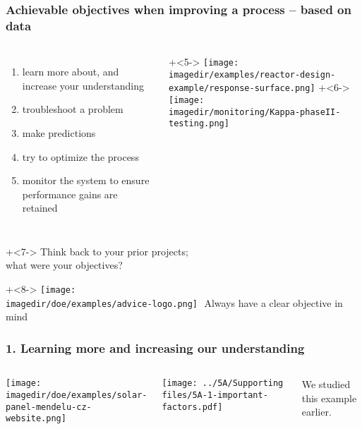 \begin{frame}\frametitle{Achievable objectives when improving a process -- based on data}
	\pause
	\begin{columns}[t]
			\begin{enumerate}
				\item	learn more about, and increase your understanding  \pause
				\item	troubleshoot a problem  \pause
				\item	make predictions  \pause
				\item	try to optimize the process  \pause
				\item	monitor the system to ensure performance gains are retained  \pause
			\end{enumerate}
	
			\onslide+<5->{
				\texttt{[image: \\imagedir/examples/reactor-design-example/response-surface.png]}
			}
			\onslide+<6->{
				\texttt{[image: \\imagedir/monitoring/Kappa-phaseII-testing.png]}
			}
			
	\end{columns}
	
	\vspace{-1cm}
	\onslide+<7->{
		Think back to your prior projects; \\what were your objectives?
	}

	\vspace{1cm}
	\onslide+<8->{
		\hfill \texttt{[image: \\imagedir/doe/examples/advice-logo.png]}
		\,\,{\color{blue}Always have a clear objective in mind}
	}
\end{frame}

\begin{frame}\frametitle{1. Learning more and increasing our understanding}
	\begin{columns}[T]
			\texttt{[image: \\imagedir/doe/examples/solar-panel-mendelu-cz-website.png]}
			
			
			
			\texttt{[image: ../5A/Supporting files/5A-1-important-factors.pdf]}
		
			\vspace{.5cm}
			\color{myOrange}\tiny We studied this example earlier.
			
	\end{columns}
\end{frame}

